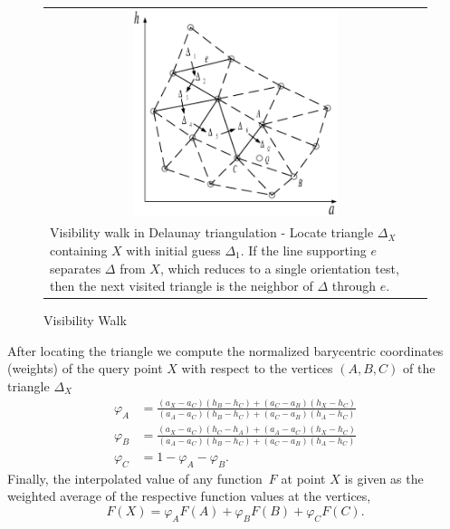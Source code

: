 \documentclass[a4paper,12pt]{article}%
\begin{document}
\begin{figure}[htb] \centering
\caption{Visibility Walk}
\begin{tabular}
[c]{p{15cm}}
\\
\multicolumn{1}{c}{{\includegraphics[height=6.0cm, width=7.5cm]{Abbildungen/visibility_walk_2.eps}}} \\
{\footnotesize Visibility walk in Delaunay triangulation - Locate triangle $\Delta_{X}$ containing $X$ with initial guess $\Delta_{1}$. If the line supporting $e$ separates $\Delta$ from $X$, which reduces to a single orientation test, then the next visited triangle is the neighbor of $\Delta$ through $e$.}
\end{tabular}
\label{Visibility walk}
\end{figure}

After locating the triangle we compute the normalized barycentric coordinates (weights) of the query point $X$ with respect to the vertices $(A,B,C)$ of the triangle $\Delta_{X}$
\begin{align*}
\varphi_{A}  &  =\frac{\left(  a_{X}-a_{C}\right)  \left(  h_{B}-h_{C}\right)+\left(  a_{C}-a_{B}\right)  \left(  h_{X}-h_{C}\right)  }{\left(  a_{A}-a_{C}\right)  \left(  h_{B}-h_{C}\right)  +\left(  a_{C}-a_{B}\right)\left(  h_{A}-h_{C}\right)  }\\
\varphi_{B}  &  =\frac{\left(  a_{X}-a_{C}\right)  \left(  h_{C}-h_{A}\right)+\left(  a_{A}-a_{C}\right)  \left(  h_{X}-h_{C}\right)  }{\left(  a_{A}-a_{C}\right)  \left(  h_{B}-h_{C}\right)  +\left(  a_{C}-a_{B}\right)\left(  h_{A}-h_{C}\right)  }\\
\varphi_{C}  &  =1-\varphi_{A}-\varphi_{B}.
\end{align*}
Finally, the interpolated value of any function~$F$ at point $X$ is given as the weighted average of the respective function values at the vertices,
\[
F\left(  X\right)  =\varphi_{A}F(A)+\varphi_{B}F(B)+\varphi_{C}F(C).
\]
\end{document}
